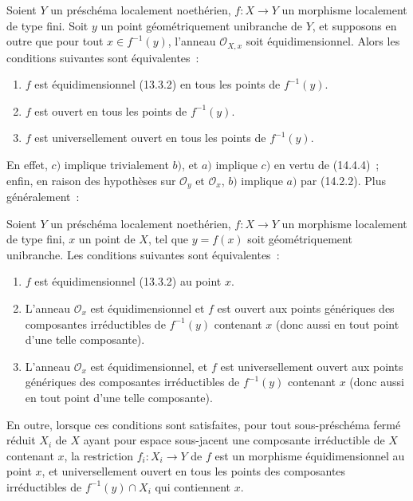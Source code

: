 
\begin{corollary}[14.4.6]
\label{IV.14.4.6-fr}
Soient $Y$ un préschéma localement noethérien, $f:X\to Y$ un morphisme localement
de type fini. Soit $y$ un point géométriquement unibranche de $Y$, et supposons en
outre que pour tout $x\in f^{-1}(y)$, l'anneau $\mathcal O_{X,x}$ soit
équidimensionnel. Alors les conditions suivantes sont équivalentes~:
\begin{enumerate}[label=\emph{\alph*)}]
  \item $f$ est équidimensionnel (13.3.2) en tous les points de $f^{-1}(y)$.
  \item $f$ est ouvert en tous les points de $f^{-1}(y)$.
  \item $f$ est universellement ouvert en tous les points de $f^{-1}(y)$.
\end{enumerate}
\end{corollary}

En effet, $c)$ implique trivialement $b)$, et $a)$ implique $c)$ en vertu de
(14.4.4)~; enfin, en raison des hypothèses sur $\mathcal O_y$ et $\mathcal O_x$,
$b)$ implique $a)$ par (14.2.2). Plus généralement~:

\begin{proposition}[14.4.7]
\label{IV.14.4.7-fr}
Soient $Y$ un préschéma localement noethérien, $f:X\to Y$ un morphisme localement
de type fini, $x$ un point de $X$, tel que $y=f(x)$ soit géométriquement unibranche.
Les conditions suivantes sont équivalentes~:
\begin{enumerate}[label=\emph{\alph*)}]
  \item $f$ est équidimensionnel (13.3.2) au point $x$.
  \item L'anneau $\mathcal O_x$ est équidimensionnel et $f$ est ouvert aux points
  génériques des composantes irréductibles de $f^{-1}(y)$ contenant $x$ (donc
  aussi en tout point d'une telle composante).
  \item L'anneau $\mathcal O_x$ est équidimensionnel, et $f$ est universellement
  ouvert aux points génériques des composantes irréductibles de $f^{-1}(y)$
  contenant $x$ (donc aussi en tout point d'une telle composante).
\end{enumerate}
En outre, lorsque ces conditions sont satisfaites, pour tout sous-préschéma fermé
réduit $X_i$ de $X$ ayant pour espace sous-jacent une composante irréductible de $X$
contenant $x$, la restriction $f_i:X_i\to Y$ de $f$ est un morphisme
équidimensionnel au point $x$, et universellement ouvert en tous les points des
composantes irréductibles de $f^{-1}(y)\cap X_i$ qui contiennent $x$.
\end{proposition}

